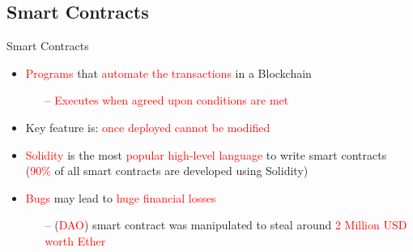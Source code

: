 \documentclass[aspectratio=169]{beamer}
\begin{document}
\subsection{Smart Contracts}
\begin{frame}{Smart Contracts}

 \begin{itemize}

\item \textcolor{red}{Programs} that \textcolor{red}{automate the transactions} in a Blockchain
\begin{itemize}
\item[--] \textcolor{red}{Executes when agreed upon conditions are met}
\end{itemize}
\item Key feature is: \textcolor{red}{once deployed cannot be modified}
\item \textcolor{red}{Solidity} is the most \textcolor{red}{popular high-level language} to write smart contracts (\textcolor{red}{90\%} of all smart contracts are developed using Solidity)
\item \textcolor{red}{Bugs} may lead to \textcolor{red}{huge financial losses}
\begin{itemize}
\item[--] (\textcolor{red}{DAO}) smart contract was manipulated to steal around \textcolor{red}{2 Million USD worth Ether}
\end{itemize}
\end{itemize}
\end{frame}
%


%
\end{document}
